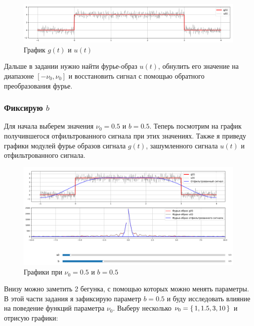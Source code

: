 \documentclass[a4paper,12pt]{article}
\begin{document}
\begin{figure}[H]  
    \centering
    \includegraphics[width=1\textwidth]{../images/signalShum.png}
    \caption{График \(g(t)\) и \(u(t)\)}  
    \label{fig:my_image}  
\end{figure}
\hypertarget{mytext}{
Дальше в задании нужно найти фурье-образ \(u(t)\), обнулить его значение на диапазоне \([- \nu_0, \nu_0]\)
и восстановить сигнал с помощью обратного преобразования фурье.
}
\subsubsection{Фиксирую \(b\)}

Для начала выберем значения \(\nu_0 = 0.5\) и \(b = 0.5\). Теперь посмотрим на график
получившегося отфильтрованного сигнала при этих значениях. Также я приведу графики 
модулей фурье образов сигнала \(g(t)\), зашумленного сигнала \(u(t)\) и отфильтрованного сигнала.

\begin{figure}[H]  
    \centering
    \includegraphics[width=1\textwidth]{../images/1.1_0.5_0.5.png}
    \caption{Графики при \(\nu_0 = 0.5\) и \(b = 0.5\)}  
    \label{fig:my_image}  
\end{figure}


Внизу можно заметить 2 бегунка, с помощью которых можно менять параметры.
В этой части задания я зафиксирую параметр \(b = 0.5\) и буду исследовать влияние
на поведение функций параметра \(\nu_0\). Выберу несколько \(\nu_0 = \set{1, 1.5, 3, 10}\)
и отрисую графики:
\end{document}
